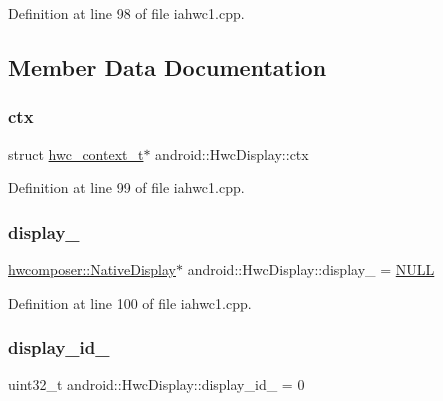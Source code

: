 Definition at line 98 of file iahwc1.\+cpp.



\subsection{Member Data Documentation}
\mbox{\label{structandroid_1_1HwcDisplay_a66a47d55af0cc45dfa51bad548194c9b}} 
\subsubsection{\texorpdfstring{ctx}{ctx}}
{\footnotesize\ttfamily struct \mbox{\hyperlink{structandroid_1_1hwc__context__t}{hwc\+\_\+context\+\_\+t}}$\ast$ android\+::\+Hwc\+Display\+::ctx}



Definition at line 99 of file iahwc1.\+cpp.

\mbox{\label{structandroid_1_1HwcDisplay_a2859906e828a920a80a55f2d251be045}} 
\subsubsection{\texorpdfstring{display\+\_\+}{display\_}}
{\footnotesize\ttfamily \mbox{\hyperlink{classhwcomposer_1_1NativeDisplay}{hwcomposer\+::\+Native\+Display}}$\ast$ android\+::\+Hwc\+Display\+::display\+\_\+ = \mbox{\hyperlink{alios_2platformdefines_8h_a070d2ce7b6bb7e5c05602aa8c308d0c4}{N\+U\+LL}}}



Definition at line 100 of file iahwc1.\+cpp.

\mbox{\label{structandroid_1_1HwcDisplay_af42dd352ac6360fa0b1a5c5988030b25}} 
\subsubsection{\texorpdfstring{display\+\_\+id\+\_\+}{display\_id\_}}
{\footnotesize\ttfamily uint32\+\_\+t android\+::\+Hwc\+Display\+::display\+\_\+id\+\_\+ = 0}



